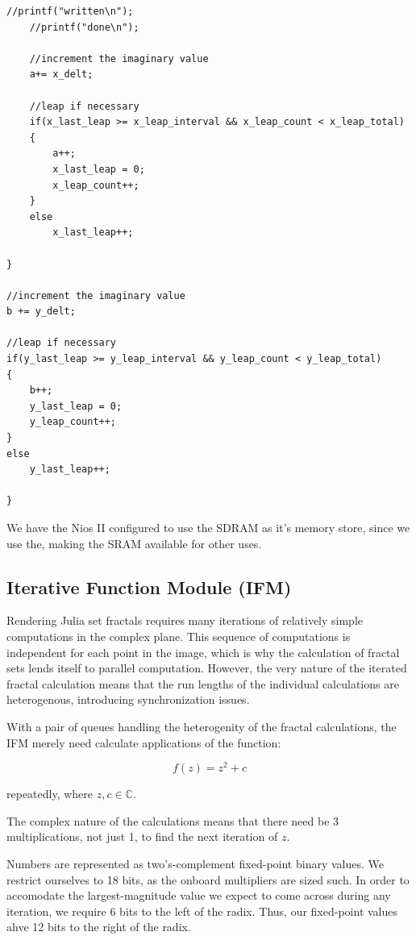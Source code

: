 \documentclass{article}
\begin{document}
\begin{lstlisting}[caption="Window Generation Procedure"]
    //printf("written\n");
    //printf("done\n");           
   
    //increment the imaginary value
    a+= x_delt;           
   
    //leap if necessary
    if(x_last_leap >= x_leap_interval && x_leap_count < x_leap_total)
    {
        a++;
        x_last_leap = 0;
        x_leap_count++;
    }
    else
        x_last_leap++;          
   
}

//increment the imaginary value
b += y_delt;

//leap if necessary
if(y_last_leap >= y_leap_interval && y_leap_count < y_leap_total)
{
    b++;
    y_last_leap = 0;
    y_leap_count++;
}
else
    y_last_leap++;

}
\end{lstlisting}



We have the Nios II configured to use the SDRAM as it's memory store, since we use the, making the SRAM available for other uses.

\subsection{Iterative Function Module (IFM)}

Rendering Julia set fractals requires
many iterations of relatively simple computations in the complex plane. This sequence of computations is independent for each point in the image, which is why the calculation of fractal sets lends itself to parallel
computation. However, the very nature of the iterated fractal calculation
means that the run lengths of the individual calculations are heterogenous, introducing synchronization issues.

With a pair of queues handling the heterogenity of the fractal
calculations, the IFM merely need calculate applications of the function:

\begin{equation}
f(z) = z^2 + c
\end{equation}

repeatedly, where $z,c \in \mathbb{C}$.


The complex nature of the calculations means that there need be 3
multiplications, not just 1, to find the next iteration of $z$.

Numbers are represented as two's-complement fixed-point binary values. We restrict ourselves to 18 bits, as the onboard multipliers are sized such. In order to accomodate the largest-magnitude value we expect to come across during any iteration, we require 6 bits to the left of the radix. Thus, our fixed-point values ahve 12 bits to the right of the radix.
\end{document}

